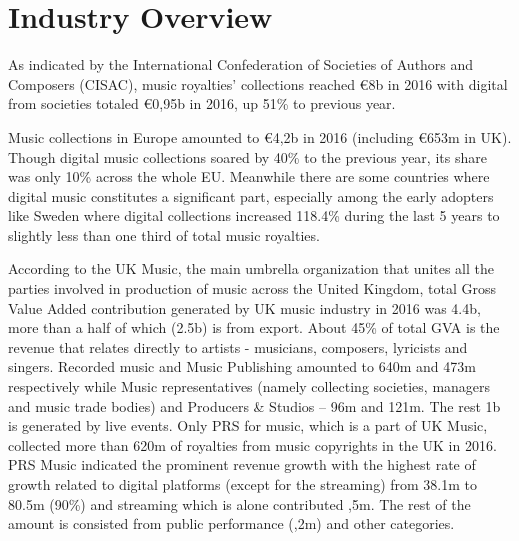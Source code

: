 \documentclass[12pt]{report}
\begin{document}
\chapter{Industry Overview}
\label{industry}
\begin{multicols}{2}
As indicated by the International Confederation of Societies of Authors and Composers (CISAC), music royalties’ collections reached \euro 8b in 2016 with digital from societies totaled \euro 0,95b in 2016, up 51\% to previous year.

Music collections in Europe amounted to \euro 4,2b in 2016 (including \euro 653m in UK). Though digital music collections soared by 40\% to the previous year, its share was only 10\% across the whole EU. Meanwhile there are some countries where digital music constitutes a significant part, especially among the early adopters like Sweden where digital collections increased 118.4\% during the last 5 years to slightly less than one third of total music royalties.
 
According to the UK Music, the main umbrella organization that unites all the parties involved in production of music across the United Kingdom, total Gross Value Added contribution generated by UK music industry in 2016 was \textsterling 4.4b, more than a half of which (\textsterling 2.5b) is from export. About 45\% of total GVA is the revenue that relates directly to artists - musicians, composers, lyricists and singers. Recorded music and Music Publishing amounted to \textsterling 640m and \textsterling 473m respectively while Music representatives (namely collecting societies, managers and music trade bodies) and Producers \& Studios – \textsterling 96m and \textsterling 121m. The rest \textsterling 1b is generated by live events.  Only PRS for music, which is a part of UK Music, collected more than \textsterling 620m of royalties from music copyrights in the UK in 2016. PRS Music indicated the prominent revenue growth with the highest rate of growth related to digital platforms (except for the streaming) from \textsterling 38.1m to \textsterling 80.5m (90\%) and streaming which is alone contributed ,5m. The rest of the amount is consisted from public performance (,2m) and other categories.
                                                                                                                                          	

\end{multicols}
\end{document}
